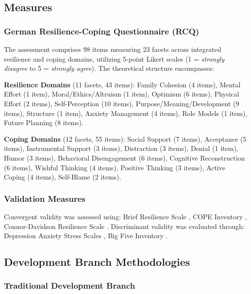 \documentclass[12pt,a4paper]{article}
\begin{document}
\subsection{Measures}

\subsubsection{German Resilience-Coping Questionnaire (RCQ)}

The assessment comprises 98 items measuring 23 facets across integrated resilience and coping domains, utilizing 5-point Likert scales (1 = \textit{strongly disagree} to 5 = \textit{strongly agree}). The theoretical structure encompasses:

\textbf{Resilience Domains} (11 facets, 43 items): Family Cohesion (4 items), Mental Effort (1 item), Moral/Ethics/Altruism (1 item), Optimism (6 items), Physical Effort (2 items), Self-Perception (10 items), Purpose/Meaning/Development (9 items), Structure (1 item), Anxiety Management (4 items), Role Models (1 item), Future Planning (8 items).

\textbf{Coping Domains} (12 facets, 55 items): Social Support (7 items), Acceptance (5 items), Instrumental Support (3 items), Distraction (3 items), Denial (1 item), Humor (3 items), Behavioral Disengagement (6 items), Cognitive Reconstruction (6 items), Wishful Thinking (4 items), Positive Thinking (3 items), Active Coping (4 items), Self-Blame (2 items).

\subsubsection{Validation Measures}

Convergent validity was assessed using: Brief Resilience Scale \cite{Smith2008}, COPE Inventory \cite{Carver1997}, Connor-Davidson Resilience Scale \cite{Connor2003}. Discriminant validity was evaluated through: Depression Anxiety Stress Scales \cite{Lovibond1995}, Big Five Inventory \cite{John2008}.

\subsection{Development Branch Methodologies}

\subsubsection{Traditional Development Branch}
\end{document}
